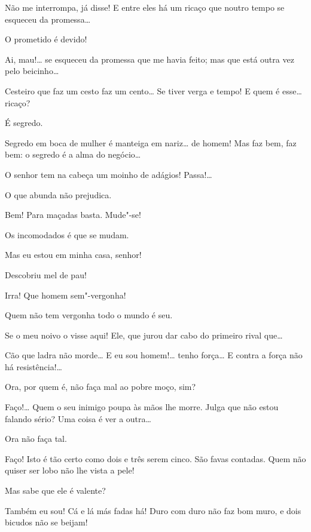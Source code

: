   Não me interrompa, já disse! E entre eles há um ricaço que noutro
tempo se esqueceu da promessa\ldots{}

  O prometido é devido!

  Ai, mau!\ldots{} se esqueceu da promessa que me havia feito; mas
que está outra vez pelo beicinho\ldots{}

  Cesteiro que faz um cesto faz um cento\ldots{}  Se tiver verga e tempo! E quem é esse\ldots{} ricaço?

  É segredo.

  Segredo em boca de mulher é manteiga em nariz\ldots{}  de homem! Mas faz bem, faz bem: o segredo é a alma do
negócio\ldots{}

  O senhor tem na cabeça um moinho de adágios! Passa!\ldots{}

  O que abunda não prejudica.

  Bem! Para maçadas basta. Mude"-se!

  Os incomodados é que se mudam.

  Mas eu estou em minha casa, senhor!

  Descobriu mel de pau!

  Irra! Que homem sem"-vergonha!

   Quem não tem vergonha
todo o mundo é seu.

  Se o meu noivo o visse aqui! Ele, que jurou dar cabo do primeiro
rival que\ldots{}

  Cão que ladra não morde\ldots{} E eu sou homem!\ldots{} tenho
força\ldots{} E contra a força não há resistência!\ldots{}

   Ora, por quem é, não faça mal ao pobre moço, sim?

  Faço!\ldots{} Quem o seu inimigo poupa às mãos lhe morre.  Julga
que não estou falando sério? Uma coisa é ver a outra\ldots{}

   Ora não faça tal.

  Faço! Isto é tão certo como dois e três serem cinco. São favas
contadas.
Quem não quiser ser lobo não lhe vista a pele!

  Mas sabe que ele é valente?

  Também eu sou! Cá e lá más fadas há! Duro com duro não faz bom
muro, e dois bicudos não se beijam!

